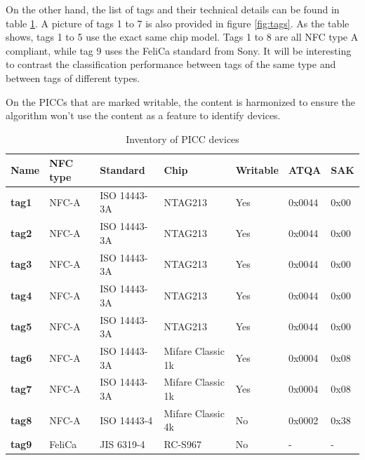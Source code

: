 On the other hand, the list of tags and their technical details can be found in table \ref{tab:picc-inventory}. A picture of tags 1 to 7 is also provided in figure \ref{fig:tags}. As the table shows, tags 1 to 5 use the exact same chip model. Tags 1 to 8 are all NFC type A compliant, while tag 9 uses the FeliCa standard from Sony. It will be interesting to contrast the classification performance between tags of the same type and between tags of different types.

On the PICCs that are marked writable, the content is harmonized to ensure the algorithm won't use the content as a feature to identify devices.

\begin{table}[h!]
  \centering
  \begin{tabular}{|l|l|l|l|l|l|l|}
    \hline
    \textbf{Name} & \textbf{NFC type} & \textbf{Standard} & \textbf{Chip}     & \textbf{Writable} & \textbf{ATQA} & \textbf{SAK} \\ \hline
    \textbf{tag1} & NFC-A             & ISO 14443-3A      & NTAG213           & Yes               & 0x0044        & 0x00         \\ \hline
    \textbf{tag2} & NFC-A             & ISO 14443-3A      & NTAG213           & Yes               & 0x0044        & 0x00         \\ \hline
    \textbf{tag3} & NFC-A             & ISO 14443-3A      & NTAG213           & Yes               & 0x0044        & 0x00         \\ \hline
    \textbf{tag4} & NFC-A             & ISO 14443-3A      & NTAG213           & Yes               & 0x0044        & 0x00         \\ \hline
    \textbf{tag5} & NFC-A             & ISO 14443-3A      & NTAG213           & Yes               & 0x0044        & 0x00         \\ \hline \hline
    \textbf{tag6} & NFC-A             & ISO 14443-3A      & Mifare Classic 1k & Yes               & 0x0004        & 0x08         \\ \hline
    \textbf{tag7} & NFC-A             & ISO 14443-3A      & Mifare Classic 1k & Yes               & 0x0004        & 0x08         \\ \hline
    \textbf{tag8} & NFC-A             & ISO 14443-4       & Mifare Classic 4k & No                & 0x0002        & 0x38         \\ \hline
    \textbf{tag9} & FeliCa            & JIS 6319-4        & RC-S967           & No                & -             & -            \\ \hline
  \end{tabular}
  \caption{Inventory of PICC devices}
  \label{tab:picc-inventory}
\end{table}

